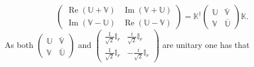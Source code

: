 \documentclass[aps, preprint]{revtex4}
\begin{document}
\begin{equation}\left (\begin{array}{cc}\ensuremath{\operatorname*{Re}} \left (\mathbb{U} +\mathbb{V}\right ) & \ensuremath{\operatorname*{Im}} \left (\mathbb{V} +\mathbb{U}\right ) \\
\ensuremath{\operatorname*{Im}} \left (\mathbb{V} -\mathbb{U}\right ) & \ensuremath{\operatorname*{Re}} \left (\mathbb{U} -\mathbb{V}\right )\end{array}\right ) =\mathbb{K}^{ \dag } \left (\begin{array}{cc}\mathbb{U} & \overline{\mathbb{V}} \\
\mathbb{V} & \overline{\mathbb{U}}\end{array}\right ) \mathbb{K}\text{.}
\end{equation}As both $\left (\begin{array}{cc}\mathbb{U} & \overline{\mathbb{V}} \\
\mathbb{V} & \overline{\mathbb{U}}\end{array}\right )$ and $\left (\begin{array}{cc}\frac{1}{\sqrt{2}} \mathbb{I}_{r} & \frac{i}{\sqrt{2}} \mathbb{I}_{r} \\
\frac{1}{\sqrt{2}} \mathbb{I}_{r} &  -\frac{i}{\sqrt{2}} \mathbb{I}_{r}\end{array}\right )$ are unitary one has that
\end{document}
